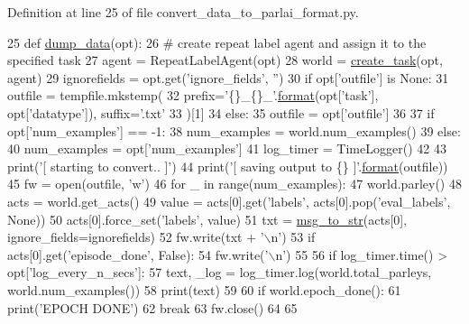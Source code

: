 Definition at line 25 of file convert\+\_\+data\+\_\+to\+\_\+parlai\+\_\+format.\+py.


\begin{DoxyCode}
25 \textcolor{keyword}{def }\hyperlink{namespaceparlai_1_1scripts_1_1convert__data__to__parlai__format_a4ed2278a6a86b341d814edbef295124c}{dump\_data}(opt):
26     \textcolor{comment}{# create repeat label agent and assign it to the specified task}
27     agent = RepeatLabelAgent(opt)
28     world = \hyperlink{namespaceparlai_1_1core_1_1worlds_a79969c7ba76d4b3c500f5bb776444dc6}{create\_task}(opt, agent)
29     ignorefields = opt.get(\textcolor{stringliteral}{'ignore\_fields'}, \textcolor{stringliteral}{''})
30     \textcolor{keywordflow}{if} opt[\textcolor{stringliteral}{'outfile'}] \textcolor{keywordflow}{is} \textcolor{keywordtype}{None}:
31         outfile = tempfile.mkstemp(
32             prefix=\textcolor{stringliteral}{'\{\}\_\{\}\_'}.\hyperlink{namespaceparlai_1_1chat__service_1_1services_1_1messenger_1_1shared__utils_a32e2e2022b824fbaf80c747160b52a76}{format}(opt[\textcolor{stringliteral}{'task'}], opt[\textcolor{stringliteral}{'datatype'}]), suffix=\textcolor{stringliteral}{'.txt'}
33         )[1]
34     \textcolor{keywordflow}{else}:
35         outfile = opt[\textcolor{stringliteral}{'outfile'}]
36 
37     \textcolor{keywordflow}{if} opt[\textcolor{stringliteral}{'num\_examples'}] == -1:
38         num\_examples = world.num\_examples()
39     \textcolor{keywordflow}{else}:
40         num\_examples = opt[\textcolor{stringliteral}{'num\_examples'}]
41     log\_timer = TimeLogger()
42 
43     print(\textcolor{stringliteral}{'[ starting to convert.. ]'})
44     print(\textcolor{stringliteral}{'[ saving output to \{\} ]'}.\hyperlink{namespaceparlai_1_1chat__service_1_1services_1_1messenger_1_1shared__utils_a32e2e2022b824fbaf80c747160b52a76}{format}(outfile))
45     fw = open(outfile, \textcolor{stringliteral}{'w'})
46     \textcolor{keywordflow}{for} \_ \textcolor{keywordflow}{in} range(num\_examples):
47         world.parley()
48         acts = world.get\_acts()
49         value = acts[0].get(\textcolor{stringliteral}{'labels'}, acts[0].pop(\textcolor{stringliteral}{'eval\_labels'}, \textcolor{keywordtype}{None}))
50         acts[0].force\_set(\textcolor{stringliteral}{'labels'}, value)
51         txt = \hyperlink{namespaceparlai_1_1utils_1_1misc_ae5db473b41d3b49814e2566e866282b6}{msg\_to\_str}(acts[0], ignore\_fields=ignorefields)
52         fw.write(txt + \textcolor{stringliteral}{'\(\backslash\)n'})
53         \textcolor{keywordflow}{if} acts[0].get(\textcolor{stringliteral}{'episode\_done'}, \textcolor{keyword}{False}):
54             fw.write(\textcolor{stringliteral}{'\(\backslash\)n'})
55 
56         \textcolor{keywordflow}{if} log\_timer.time() > opt[\textcolor{stringliteral}{'log\_every\_n\_secs'}]:
57             text, \_log = log\_timer.log(world.total\_parleys, world.num\_examples())
58             print(text)
59 
60         \textcolor{keywordflow}{if} world.epoch\_done():
61             print(\textcolor{stringliteral}{'EPOCH DONE'})
62             \textcolor{keywordflow}{break}
63     fw.close()
64 
65 
\end{DoxyCode}
